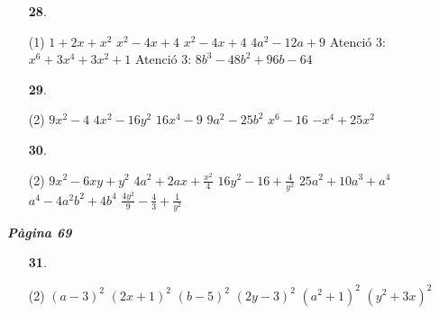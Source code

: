 \documentclass[a4paper, pdf, twoside]{book}
\begin{document}
\begin{multicols}{2}
\begin{enumerate}

 \item[\fontfamily{phv}\selectfont\color{blue}\textbf{28}. ] 
 \begin{tasks}[column-sep=1em, item-indent=1.3333em](1)
	 \task $1+2x+x^2$
	 \task $x^2-4x+4$
	 \task $x^2-4x+4$
	 \task $4a^2-12a+9$
	 \task Atenció 3: $x^6+3x^4+3x^2+1$
	 \task Atenció 3: $8b^3-48b^2+96b-64$
\end{tasks}
\vspace{0.25cm}



 \item[\fontfamily{phv}\selectfont\color{blue}\textbf{29}. ] 
 \begin{tasks}[column-sep=1em, item-indent=1.3333em](2)
	 \task $9x^2-4$
	 \task $4x^2-16y^2$
	 \task $16x^4-9$
	 \task $9a^2-25b^2$
	 \task $x^6-16$
	 \task $-x^4+25x^2$
\end{tasks}
\vspace{0.25cm}



 \item[\fontfamily{phv}\selectfont\color{blue}\textbf{30}. ] 
 \begin{tasks}[column-sep=1em, item-indent=1.3333em](2)
	 \task $9x^2-6xy+y^2$
	 \task $4a^2+2ax+\frac {x^2}{4}$
	 \task $16y^2-16+\frac {4}{y^2}$
	 \task $25a^2+10a^3+a^4$
	 \task $a^4-4a^2b^2+4b^4$
	 \task* $\frac {4y^2}{9}-\frac {4}{3}+\frac {1}{y^2}$
\end{tasks}
 \end{enumerate}
\vspace{0.3cm}


{\textbf{\em Pàgina 69}} \hrulefill
\begin{enumerate}
\vspace{0.25cm}



 \item[\fontfamily{phv}\selectfont\color{blue}\textbf{31}. ] 
 \begin{tasks}[column-sep=1em, item-indent=1.3333em](2)
	 \task $(a-3)^2$
	 \task $(2x+1)^2$
	 \task $(b-5)^2$
	 \task $(2y-3)^2$
	 \task $(a^2+1)^2$
	 \task $(y^2+3x)^2$
\end{tasks}
 \end{enumerate}
\begin{enumerate}
\vspace{0.25cm}



\end{enumerate}
\end{multicols}
\end{document}
